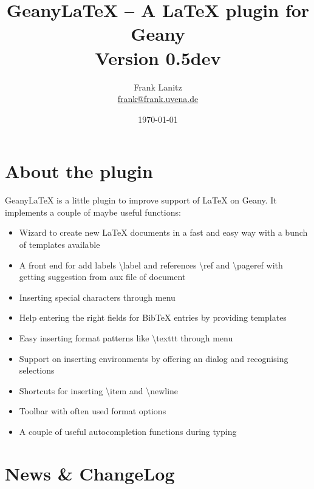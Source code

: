 \documentclass[%
a4paper,%
10pt,%
oneside,%
DIV18,
headsepline,
plainheadsepline,
footsepline,
plainfootsepline,
bibtotoc,%
liststotoc,%
BCOR12mm,%
halfparskip,%
openany,%
]{scrartcl}
\title{Geany\LaTeX{} -- A \LaTeX{} plugin for Geany \\[1.5ex]
	   \normalsize Version 0.5dev}
\author{Frank Lanitz \\ \small{\href{mailto:frank@frank.uvena.de}{frank@frank.uvena.de}}}
\date{\today}
\begin{document}
\dedication{\normalsize \textbf{Note:} Please note the document has been created on
\today. If you are using devel version from SVN, please compile and check
\texttt{doc/geanylatex.tex} from sources. Please check page \pageref
{sec:compiling_of_documentation}, section \ref{sec:compiling_of_documentation} how to do so. }

\maketitle
\tableofcontents
\listoftables
\listoffigures
\newpage
{}
\section{About the plugin}

Geany\LaTeX{} is a little plugin to improve support of \LaTeX{} on Geany.
It implements a couple of maybe useful functions:

\begin{itemize}
	\item Wizard to create new \LaTeX{} documents in a fast and easy way
	 	  with a bunch of templates available
	\item A front end for add labels \textbackslash label{} and
		  references \textbackslash ref{} and \textbackslash pageref{}
   		  with getting suggestion from aux file of document
	\item Inserting special characters through menu
	\item Help entering the right fields for BibTeX entries by
		  providing templates
	\item Easy inserting format patterns like \textbackslash texttt{}
		  through menu
	\item Support on inserting environments by offering an dialog and
		  recognising selections
	\item Shortcuts for inserting \textbackslash item and
		  \textbackslash newline
	\item Toolbar with often used format options
	\item A couple of useful autocompletion functions during typing
\end{itemize}

\newpage
\section{News \& ChangeLog}
\end{document}
